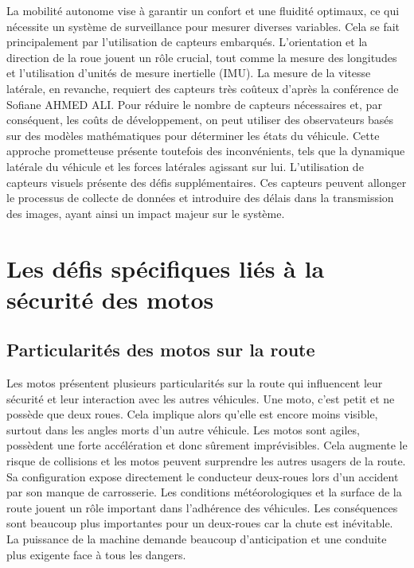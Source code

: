 \documentclass{article}
\begin{document}
La mobilité autonome vise à garantir un confort et une fluidité optimaux, ce qui nécessite un système de surveillance pour mesurer diverses variables. Cela se fait principalement par l'utilisation de capteurs embarqués.
L'orientation et la direction de la roue jouent un rôle crucial, tout comme la mesure des longitudes et l'utilisation d'unités de mesure inertielle (IMU). La mesure de la vitesse latérale, en revanche, requiert des capteurs très coûteux d'après la conférence\cite{ahmed_ali_synthese_2024} de Sofiane AHMED ALI.
Pour réduire le nombre de capteurs nécessaires et, par conséquent, les coûts de développement, on peut utiliser des observateurs basés sur des modèles mathématiques pour déterminer les états du véhicule. Cette approche prometteuse présente toutefois des inconvénients, tels que la dynamique latérale du véhicule et les forces latérales agissant sur lui.
L'utilisation de capteurs visuels présente des défis supplémentaires. Ces capteurs peuvent allonger le processus de collecte de données et introduire des délais dans la transmission des images, ayant ainsi un impact majeur sur le système.




\newpage
\section{Les défis spécifiques liés à la sécurité des motos}

\subsection{Particularités des motos sur la route}
Les motos présentent plusieurs particularités sur la route qui influencent leur sécurité et leur interaction avec les autres véhicules.
Une moto, c'est petit et ne possède que deux roues. Cela implique alors qu'elle est encore moins visible, surtout dans les angles morts d'un autre véhicule. Les motos sont agiles, possèdent une forte accélération et donc sûrement imprévisibles. Cela augmente le risque de collisions et les motos peuvent surprendre les autres usagers de la route. Sa configuration expose directement le conducteur deux-roues lors d'un accident par son manque de carrosserie. Les conditions météorologiques et la surface de la route jouent un rôle important dans l'adhérence des véhicules. Les conséquences sont beaucoup plus importantes pour un deux-roues car la chute est inévitable.
La puissance de la machine demande beaucoup d'anticipation et une conduite plus exigente face à tous les dangers.
\end{document}
